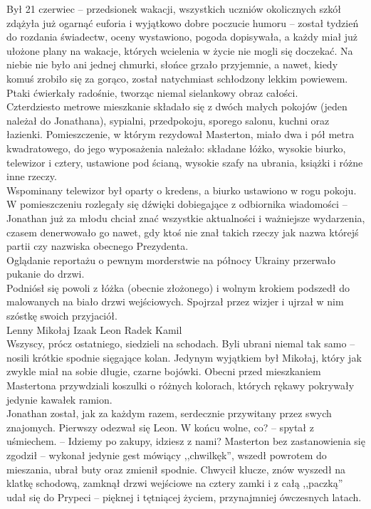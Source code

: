 \documentclass[../MAIN.tex]{subfiles}
\begin{document}
Był 21 czerwiec -- przedsionek wakacji, wszystkich uczniów okolicznych szkół zdążyła już ogarnąć euforia i wyjątkowo dobre poczucie humoru -- został tydzień do rozdania świadectw, oceny wystawiono, pogoda dopisywała, a każdy miał już ułożone plany na wakacje, których wcielenia w życie nie mogli się doczekać. Na niebie nie było ani jednej chmurki, słońce grzało przyjemnie, a nawet, kiedy komuś zrobiło się za gorąco, został natychmiast schłodzony lekkim powiewem. Ptaki ćwierkały radośnie, tworząc niemal sielankowy obraz całości. \\
Czterdziesto metrowe mieszkanie składało się z dwóch małych pokojów (jeden należał do Jonathana), sypialni, przedpokoju, sporego salonu, kuchni oraz łazienki. Pomieszczenie, w którym rezydował Masterton, miało dwa i pół metra kwadratowego, do jego wyposażenia należało: składane łóżko, wysokie biurko, telewizor i cztery, ustawione pod ścianą, wysokie szafy na ubrania, książki i różne inne rzeczy.\\ Wspominany telewizor był oparty o kredens, a biurko ustawiono w rogu pokoju. W pomieszczeniu rozlegały się dźwięki dobiegające z odbiornika wiadomości -- Jonathan już za młodu chciał znać wszystkie aktualności i ważniejsze wydarzenia, czasem denerwowało go nawet, gdy ktoś nie znał takich rzeczy jak nazwa którejś partii czy nazwiska obecnego Prezydenta. \\
Oglądanie reportażu o pewnym morderstwie na północy Ukrainy przerwało pukanie do drzwi. \\
Podniósł się powoli z łóżka (obecnie złożonego) i wolnym krokiem podszedł do malowanych na biało drzwi wejściowych. Spojrzał przez wizjer i ujrzał w nim szóstkę swoich przyjaciół. \\
Lenny\dotfill
Mikołaj\dotfill
Izaak\dotfill
Leon\dotfill
Radek\dotfill
Kamil\\
Wszyscy, prócz ostatniego, siedzieli na schodach. Byli ubrani niemal tak samo -- nosili krótkie spodnie sięgające kolan. Jedynym wyjątkiem był Mikołaj, który jak zwykle miał na sobie długie, czarne bojówki. Obecni przed mieszkaniem Mastertona przywdziali koszulki o różnych kolorach, których rękawy pokrywały jedynie kawałek ramion.\\
Jonathan został, jak za każdym razem, serdecznie przywitany przez swych znajomych. Pierwszy odezwał się Leon.
\sx W końcu wolne, co? -- spytał z uśmiechem. -- Idziemy po zakupy, idziesz z nami?
\qd
Masterton bez zastanowienia się zgodził -- wykonał jedynie gest mówiący ,,chwilkę\3k'', wszedł powrotem do mieszania, ubrał buty oraz zmienił spodnie. Chwycił klucze, znów wyszedł na klatkę schodową, zamknął drzwi wejściowe na cztery zamki i z całą ,,paczką'' udał się do Prypeci -- pięknej i tętniącej życiem, przynajmniej ówczesnych latach.
\end{document}
